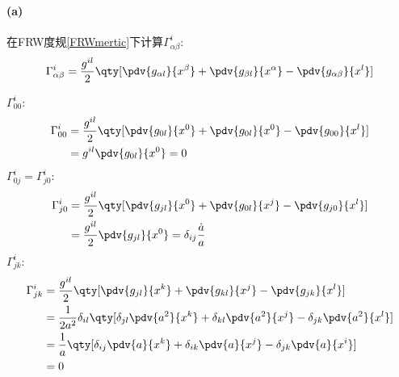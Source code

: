 \paragraph{(a)}
在FRW度规\ref{FRWmertic}下计算$\Gamma^i_{\alpha\beta}$:
\begin{align*}
    \Gamma^i_{\alpha\beta} = \frac{g^{il}}{2}\qty[\pdv{g_{\alpha l}}{x^\beta} + \pdv{g_{\beta l}}{x^\alpha} - \pdv{g_{\alpha\beta}}{x^l}]
\end{align*}

$\Gamma^i_{00}$:
\begin{align*}
    \Gamma^i_{00} &= \frac{g^{il}}{2}\qty[\pdv{g_{0 l}}{x^0} + \pdv{g_{0 l}}{x^0} - \pdv{g_{00}}{x^l}]\\
        &=g^{il}\pdv{g_{0 l}}{x^0} = 0
\end{align*}
$\Gamma^i_{0j} = \Gamma^i_{j0}$:
\begin{align*}
    \Gamma^i_{j0} &= \frac{g^{il}}{2}\qty[\pdv{g_{j l}}{x^0} + \pdv{g_{0 l}}{x^j} - \pdv{g_{j0}}{x^l}]\\
    &=\frac{g^{il}}{2} \pdv{g_{j l}}{x^0} = \delta_{ij}\frac{\dot{a}}{a}
\end{align*}
$\Gamma^i_{jk}$:
\begin{align*}
    \Gamma^i_{jk} &= \frac{g^{il}}{2}\qty[\pdv{g_{j l}}{x^k} + \pdv{g_{k l}}{x^j} - \pdv{g_{jk}}{x^l}]\\
        &=\frac{1}{2a^2}\delta_{il}\qty[\delta_{j l}\pdv{a^2}{x^k} + \delta_{k l}\pdv{a^2}{x^j} - \delta_{jk}\pdv{a^2}{x^l}]\\
        &=\frac{1}{a}\qty[\delta_{ij}\pdv{a}{x^k} + \delta_{ik}\pdv{a}{x^j} - \delta_{jk}\pdv{a}{x^i}]\\
        &=0
\end{align*}

